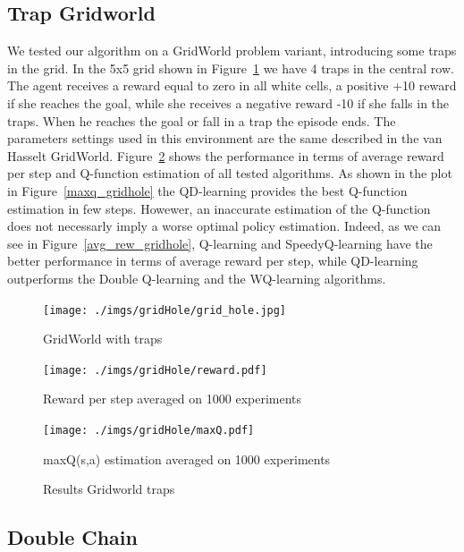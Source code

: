 \documentclass[conference]{IEEEtran}
\begin{document}
\subsection{Trap Gridworld}
We tested our algorithm on a GridWorld problem variant, introducing some traps in the grid. In the 5x5 grid shown in Figure~\ref{F:gridhole} we have 4 traps in the central row. The agent receives a reward equal to zero in all white cells, a positive +10 reward if she reaches the goal, while she receives a negative reward -10 if she falls in the traps. When he reaches the goal or fall in a trap the episode ends.
The parameters settings used in this environment are the same described in the van Hasselt GridWorld. Figure~\ref{F:gridhole_results} shows the performance in terms of average reward per step and Q-function estimation of all tested algorithms.
As shown in the plot in Figure~\ref{maxq_gridhole} the QD-learning provides the best Q-function estimation in few steps. Howewer, an inaccurate estimation of the Q-function does not necessarly imply a worse optimal policy estimation. Indeed, as we can see in Figure~\ref{avg_rew_gridhole}, Q-learning and SpeedyQ-learning have the better performance in terms of average reward per step, while QD-learning outperforms the Double Q-learning and the WQ-learning algorithms. 


\begin{figure}
\centering
\texttt{[image: ./imgs/gridHole/grid\_hole.jpg]}
\caption{GridWorld with traps}
\label{F:gridhole}
\end{figure}

\begin{figure}
\begin{minipage}{\textwidth}
  
   \texttt{[image: ./imgs/gridHole/reward.pdf]}\label{avg_rew_gridhole}\caption{Reward per step averaged on 1000 experiments }
   \texttt{[image: ./imgs/gridHole/maxQ.pdf]}	\label{maxq_gridhole}\caption{maxQ(s,a) estimation averaged on 1000 experiments}
  \end{minipage}
  \label{F:gridhole_results}
  \caption{Results Gridworld traps}
  \end{figure}

\subsection{Double Chain}
\end{document}
